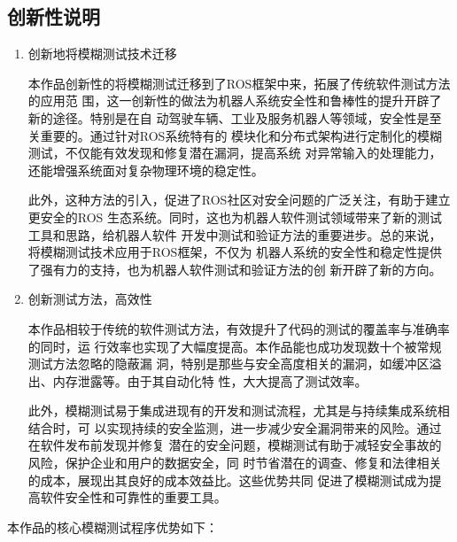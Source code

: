 \subsection{创新性说明}
\begin{enumerate}
  \item 创新地将模糊测试技术迁移
  
  本作品创新性的将模糊测试迁移到了ROS框架中来，拓展了传统软件测试方法的应用范
  围，这一创新性的做法为机器人系统安全性和鲁棒性的提升开辟了新的途径。特别是在自
  动驾驶车辆、工业及服务机器人等领域，安全性是至关重要的。通过针对ROS系统特有的
  模块化和分布式架构进行定制化的模糊测试，不仅能有效发现和修复潜在漏洞，提高系统
  对异常输入的处理能力，还能增强系统面对复杂物理环境的稳定性。
  
  此外，这种方法的引入，促进了ROS社区对安全问题的广泛关注，有助于建立更安全的ROS
  生态系统。同时，这也为机器人软件测试领域带来了新的测试工具和思路，给机器人软件
  开发中测试和验证方法的重要进步。总的来说，将模糊测试技术应用于ROS框架，不仅为
  机器人系统的安全性和稳定性提供了强有力的支持，也为机器人软件测试和验证方法的创
  新开辟了新的方向。
  
  \item 创新测试方法，高效性
  
  本作品相较于传统的软件测试方法，有效提升了代码的测试的覆盖率与准确率的同时，运
  行效率也实现了大幅度提高。本作品能也成功发现数十个被常规测试方法忽略的隐蔽漏
  洞，特别是那些与安全高度相关的漏洞，如缓冲区溢出、内存泄露等。由于其自动化特
  性，大大提高了测试效率。
  
  此外，模糊测试易于集成进现有的开发和测试流程，尤其是与持续集成系统相结合时，可
  以实现持续的安全监测，进一步减少安全漏洞带来的风险。通过在软件发布前发现并修复
  潜在的安全问题，模糊测试有助于减轻安全事故的风险，保护企业和用户的数据安全，同
  时节省潜在的调查、修复和法律相关的成本，展现出其良好的成本效益比。这些优势共同
  促进了模糊测试成为提高软件安全性和可靠性的重要工具。
    
\end{enumerate}

本作品的核心模糊测试程序优势如下：


